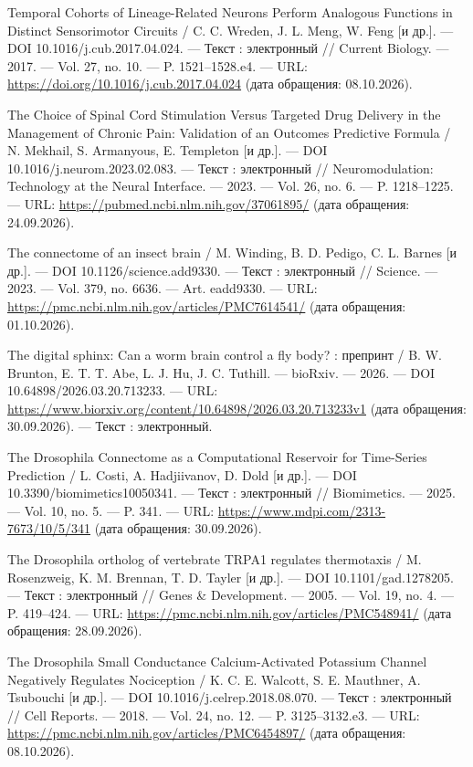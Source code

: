 \begin{list}{}{\setlength{\leftmargin}{10mm}\setlength{\labelwidth}{8mm}\setlength{\labelsep}{2mm}\setlength{\itemsep}{0pt}\setlength{\parsep}{0pt}\setlength{\topsep}{0pt}}
\item[266.] Temporal Cohorts of Lineage-Related Neurons Perform Analogous Functions in Distinct Sensorimotor Circuits / C. C. Wreden, J. L. Meng, W. Feng [и др.]. — DOI 10.1016/j.cub.2017.04.024. — Текст : электронный // Current Biology. — 2017. — Vol. 27, no. 10. — P. 1521–1528.e4. — URL: \url{https://doi.org/10.1016/j.cub.2017.04.024} (дата обращения: 08.10.2026).
\item[267.] The Choice of Spinal Cord Stimulation Versus Targeted Drug Delivery in the Management of Chronic Pain: Validation of an Outcomes Predictive Formula / N. Mekhail, S. Armanyous, E. Templeton [и др.]. — DOI 10.1016/j.neurom.2023.02.083. — Текст : электронный // Neuromodulation: Technology at the Neural Interface. — 2023. — Vol. 26, no. 6. — P. 1218–1225. — URL: \url{https://pubmed.ncbi.nlm.nih.gov/37061895/} (дата обращения: 24.09.2026).
\item[268.] The connectome of an insect brain / M. Winding, B. D. Pedigo, C. L. Barnes [и др.]. — DOI 10.1126/science.add9330. — Текст : электронный // Science. — 2023. — Vol. 379, no. 6636. — Art. eadd9330. — URL: \url{https://pmc.ncbi.nlm.nih.gov/articles/PMC7614541/} (дата обращения: 01.10.2026).
\item[269.] The digital sphinx: Can a worm brain control a fly body? : препринт / B. W. Brunton, E. T. T. Abe, L. J. Hu, J. C. Tuthill. — bioRxiv. — 2026. — DOI 10.64898/2026.03.20.713233. — URL: \url{https://www.biorxiv.org/content/10.64898/2026.03.20.713233v1} (дата обращения: 30.09.2026). — Текст : электронный.
\item[270.] The Drosophila Connectome as a Computational Reservoir for Time-Series Prediction / L. Costi, A. Hadjiivanov, D. Dold [и др.]. — DOI 10.3390/biomimetics10050341. — Текст : электронный // Biomimetics. — 2025. — Vol. 10, no. 5. — P. 341. — URL: \url{https://www.mdpi.com/2313-7673/10/5/341} (дата обращения: 30.09.2026).
\item[271.] The Drosophila ortholog of vertebrate TRPA1 regulates thermotaxis / M. Rosenzweig, K. M. Brennan, T. D. Tayler [и др.]. — DOI 10.1101/gad.1278205. — Текст : электронный // Genes \& Development. — 2005. — Vol. 19, no. 4. — P. 419–424. — URL: \url{https://pmc.ncbi.nlm.nih.gov/articles/PMC548941/} (дата обращения: 28.09.2026).
\item[272.] The Drosophila Small Conductance Calcium-Activated Potassium Channel Negatively Regulates Nociception / K. C. E. Walcott, S. E. Mauthner, A. Tsubouchi [и др.]. — DOI 10.1016/j.celrep.2018.08.070. — Текст : электронный // Cell Reports. — 2018. — Vol. 24, no. 12. — P. 3125–3132.e3. — URL: \url{https://pmc.ncbi.nlm.nih.gov/articles/PMC6454897/} (дата обращения: 08.10.2026).

\end{list}
